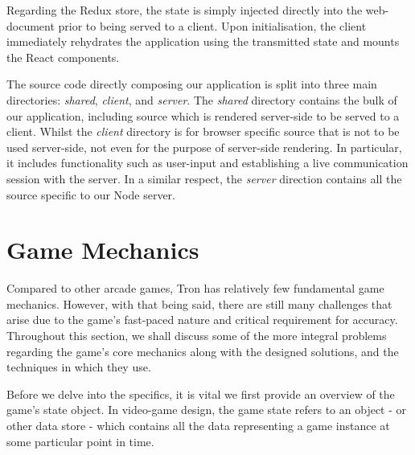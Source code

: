 \documentclass{standalone}
\begin{document}
			Regarding the Redux store, the state is simply injected directly into the web-document prior to being served to a client. Upon initialisation, the client immediately rehydrates the application using the transmitted state and mounts the React components.

			The source code directly composing our application is split into three main directories: \emph{shared}, \emph{client}, and \emph{server}. The \emph{shared} directory contains the bulk of our application, including source which is rendered server-side to be served to a client. Whilst the \emph{client} directory is for browser specific source that is not to be used server-side, not even for the purpose of server-side rendering. In particular, it includes functionality such as user-input and establishing a live communication session with the server. In a similar respect, the \emph{server} direction contains all the source specific to our Node server.

	\section{Game Mechanics}
		Compared to other arcade games, Tron has relatively few fundamental game mechanics. However, with that being said, there are still many challenges that arise due to the game's fast-paced nature and critical requirement for accuracy. Throughout this section, we shall discuss some of the more integral problems regarding the game's core mechanics along with the designed solutions, and the techniques in which they use.

		Before we delve into the specifics, it is vital we first provide an overview of the game's state object. In video-game design, the game state refers to an object - or other data store - which contains all the data representing a game instance at some particular point in time.
\end{document}
